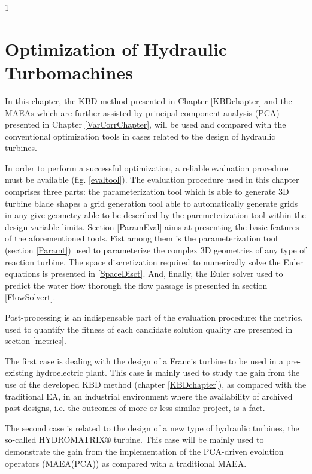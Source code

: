 1\ifpdf
    \graphicspath{{5/figures/PNG/}{5/figures/PDF/}{4/figures/}}
\else
    \graphicspath{{5/figures/EPS/}{5/figures/}}
\fi

\chapter{Optimization of Hydraulic Turbomachines} %
In this chapter, the KBD method presented in Chapter \ref{KBDchapter} and the MAEAs which are further assisted by principal component analysis (PCA) presented in Chapter \ref{VarCorrChapter}, will be used and compared with the conventional optimization tools in cases related to the design of hydraulic turbines. 

In order to perform a successful optimization, a reliable evaluation procedure must be available (fig. \ref{evaltool}). The evaluation procedure used in this chapter comprises three parts: the parameterization tool which is able to generate 3D turbine blade shapes a grid generation tool able to automatically generate grids in any give geometry able to be described by the paremeterization tool within the design variable limits. Section \ref{ParamEval} aims at presenting the basic features of the aforementioned tools. Fist among them is the  parameterization tool (section \ref{Paramt}) used to parameterize the complex 3D geometries of any type of reaction turbine. The space discretization required to numerically solve the Euler equations is presented in \ref{SpaceDisct}. And, finally, the Euler solver used to predict the water flow thorough the flow passage is presented in section \ref{FlowSolvert}.

Post-processing is an indispensable part of the evaluation procedure;  the metrics, used to quantify the fitness of each candidate solution quality are presented in section \ref{metrics}. 

The first case is  dealing with the design of a Francis turbine to be used in a pre-existing hydroelectric plant. This case is mainly used to study the gain from the use of the developed KBD method (chapter \ref{KBDchapter}), as compared with the traditional EA, in an industrial environment where the availability of archived past designs, i.e. the outcomes of more or less similar project, is a fact.

The second case is related to the design of a new type of hydraulic turbines, the so-called HYDROMATRIX$\circledR$ turbine. This case will be mainly used to demonstrate the gain from the implementation of the PCA-driven evolution operators (MAEA(PCA)) as compared with a traditional MAEA.     

